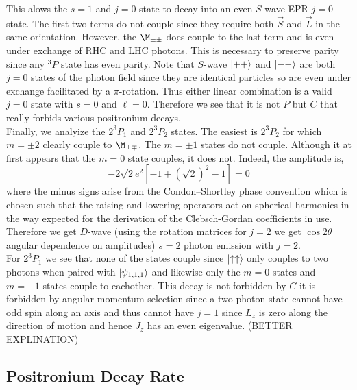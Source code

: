 \documentclass[12pt]{article}
\DeclarePairedDelimiter\ket{\lvert}{\rangle}
\begin{document}
This alows the $s = 1$ and $j = 0$ state to decay into an even $S$-wave EPR $j = 0$ state. The first two terms do not couple since they require both $\vec{S}$ and $\vec{L}$ in the same orientation. However, the $\M_{\pm \pm}$ does couple to the last term and is even under exchange of RHC and LHC photons. This is necessary to preserve parity since any ${}^3 P$ state has even parity. Note that $S$-wave $\ket{++}$ and $\ket{--}$ are both $j = 0$ states of the photon field since they are identical particles so are even under exchange facilitated by a $\pi$-rotation. Thus either linear combination is a valid $j = 0$ state with $s = 0$ and $\ell = 0$. Therefore we see that it is not $P$ but $C$ that really forbids various positronium decays. 
\bigskip\\
Finally, we analyize the $2^{3} P_1$ and $2^{3} P_2$ states. The easiest is $2^{3} P_2$ for which $m = \pm 2$ clearly couple to $\M_{\pm \mp}$. The $m = \pm 1$ states do not couple. Although it at first appears that the $m = 0$ state couples, it does not. Indeed, the amplitude is,
\[ - 2 \sqrt{2} e^2 [-1 + (\sqrt{2})^2 - 1] = 0 \]
where the minus signs arise from the Condon–Shortley phase convention which is chosen such that the raising and lowering operators act on spherical harmonics in the way expected for the derivation of the Clebsch-Gordan coefficients in use. Therefore we get $D$-wave (using the rotation matrices for $j = 2$ we get $\cos{2 \theta}$ angular dependence on amplitudes) $s = 2$ photon emission with $j = 2$. 
\bigskip\\
For $2^{3} P_1$ we see that none of the states couple since $\ket{\uparrow \uparrow}$ only couples to two photons when paired with $\ket{\psi_{1,1,1}}$ and likewise only the $m = 0$ states and $m = -1$ states couple to eachother. This decay is not forbidden by $C$ it is forbidden by angular momentum selection since a two photon state cannot have odd spin along an axis and thus cannot have $j = 1$ since $L_z$ is zero along the direction of motion and hence $J_z$ has an even eigenvalue. (BETTER EXPLINATION)

\subsection{Positronium Decay Rate}
\end{document}
